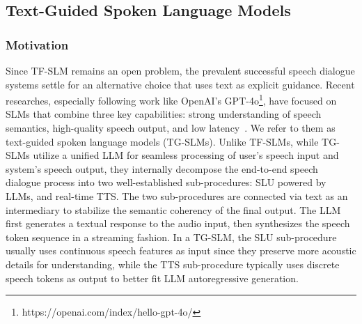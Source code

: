 \subsection{Text-Guided Spoken Language Models}
\subsubsection{Motivation}
Since TF-SLM remains an open problem, the prevalent successful speech dialogue systems settle for an alternative choice that uses text as explicit guidance.
Recent researches, especially following work like OpenAI's GPT-4o\footnote{https://openai.com/index/hello-gpt-4o/}, have focused on SLMs that combine three key capabilities: strong understanding of speech semantics, high-quality speech output, and low latency~\cite{zhang2024speechgptgen, fu2024vita, Xie2024MiniOmniLM, kyutai2024moshi, xie2024mini2, fang2024llamaomni, yu2024salmonnomni, zhong2024lyra, chen2024slamomni, chen2024emova, wang2024freezeomni, zeng2024glm, zhang2024internlm, fu2025vita, luo2025openomni, chen2025minmo}. 
We refer to them as text-guided spoken language models (TG-SLMs). 
Unlike TF-SLMs, while TG-SLMs utilize a unified LLM for seamless processing of user's speech input and system's speech output, they internally decompose the end-to-end speech dialogue process into two well-established sub-procedures: SLU powered by LLMs, and real-time TTS. 
The two sub-procedures are connected via text as an intermediary to stabilize the semantic coherency of the final output. The LLM first generates a textual response to the audio input, then synthesizes the speech token sequence in a streaming fashion. 
In a TG-SLM, the SLU sub-procedure usually uses continuous speech features as input since they preserve more acoustic details for understanding, while the TTS sub-procedure typically uses discrete speech tokens as output to better fit LLM autoregressive generation.

